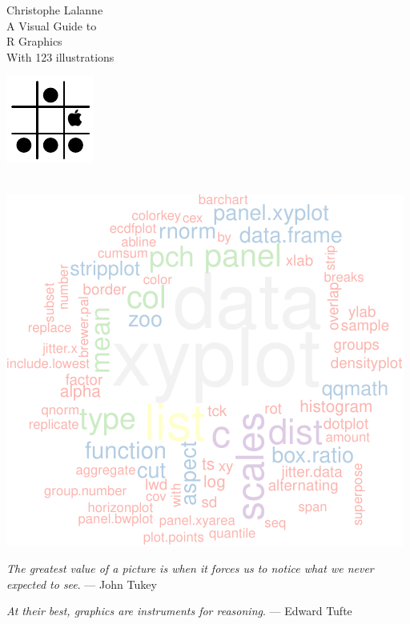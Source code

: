 \documentclass[a4paper,twoside]{book}
\newlength{\tpheight}\setlength{\tpheight}{0.9\textheight}
\newlength{\txtheight}\setlength{\txtheight}{0.9\tpheight}
\begin{document}
\pagestyle{empty}

\begingroup%
\raggedleft
\vspace*{\baselineskip}
{\Large\textsf{Christophe Lalanne}}\\[0.167\txtheight]
{\Large\titlefont A Visual Guide to}\\[\baselineskip]
{\textcolor{Medium}{\Huge\titlefont R Graphics}}\\[\baselineskip]
{\tiny\titlefont With 123 illustrations}\par
\vfill
{\includegraphics[scale=.75]{logo}\\{\small \tt \GITAbrHash}\\{\small
    \tt \VCDateTEX}}\par 
\vspace*{3\baselineskip}
\endgroup
\pagestyle{empty}
\cleardoublepage

\frontmatter
\pagestyle{empty}
\vspace*{\fill}
\centerline{\includegraphics[width=.6\textwidth]{wcindex}}
\vspace*{3\baselineskip}
\hfill{\footnotesize \emph{The greatest value of a picture is when it forces us to notice what we
never expected to see}. --- John Tukey}

\hfill{\footnotesize \emph{At their best, graphics are instruments for reasoning}. --- Edward Tufte}
\vspace*{\fill}
\cleardoublepage
{}
\tableofcontents
\end{document}
